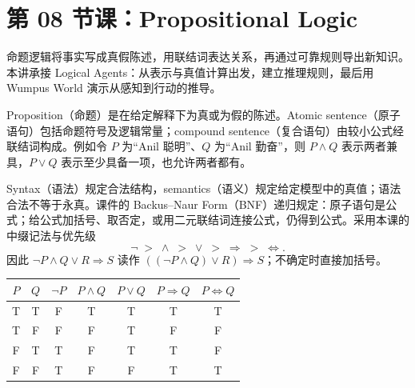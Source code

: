 \begingroup
\renewcommand{\recordid}[1]{}
\renewcommand{\relatedexercise}[2]{\hyperref[exercise:#1]{#2}}

\section{第 08 节课：Propositional Logic}
\label{lecture:SC3000-L08}


命题逻辑将事实写成真假陈述，用联结词表达关系，再通过可靠规则导出新知识。本讲承接 Logical Agents：从表示与真值计算出发，建立推理规则，最后用 Wumpus World 演示从感知到行动的推导。


Proposition（命题）是在给定解释下为真或为假的陈述。Atomic sentence（原子语句）包括命题符号及逻辑常量；compound sentence（复合语句）由较小公式经联结词构成。例如令 $P$ 为“Anil 聪明”、$Q$ 为“Anil 勤奋”，则 $P\land Q$ 表示两者兼具，$P\lor Q$ 表示至少具备一项，也允许两者都有。

Syntax（语法）规定合法结构，semantics（语义）规定给定模型中的真值；语法合法不等于永真。课件的 Backus--Naur Form（BNF）递归规定：原子语句是公式；给公式加括号、取否定，或用二元联结词连接公式，仍得到公式。采用本课的中缀记法与优先级
\[
 \neg\;>\;\land\;>\;\lor\;>\;\Rightarrow\;>\;\Leftrightarrow.
\]
因此 $\neg P\land Q\lor R\Rightarrow S$ 读作 $((\neg P\land Q)\lor R)\Rightarrow S$；不确定时直接加括号。

\begin{center}
\small
\begin{tabular}{@{}cc|ccccc@{}}
\toprule
$P$ & $Q$ & $\neg P$ & $P\land Q$ & $P\lor Q$ & $P\Rightarrow Q$ & $P\Leftrightarrow Q$ \\
\midrule
T & T & F & T & T & T & T \\
T & F & F & F & T & F & F \\
F & T & T & F & T & T & F \\
F & F & T & F & F & T & T \\
\bottomrule
\end{tabular}
\end{center}


